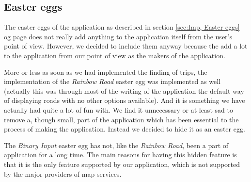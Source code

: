 \documentclass[a4paper,11pt]{article}
\begin{document}
\subsection{Easter eggs}
The easter eggs of the application as described in section \ref{sec:Imp, Easter eggs} og page \pageref{sec:Imp, Easter eggs} does not really add anything to the application itself from the user's point of view. However, we decided to include them anyway because the add a lot to the application from our point of view as the makers of the application.

More or less as soon as we had implemented the finding of trips, the implementation of the \textit{Rainbow Road} easter egg was implemented as well (actually this was through most of the writing of the application the default way of displaying roads with no other options available). And it is something we have actually had quite a lot of fun with. We find it unnecessary or at least sad to remove a, though small, part of the application which has been essential to the process of making the application. Instead we decided to hide it as an easter egg.

The \textit{Binary Input} easter egg has not, like the \textit{Rainbow Road}, been a part of application for a long time. The main reasons for having this hidden feature is that it is the only feature supported by our application, which is not supported by the major providers of map services.
\end{document}
